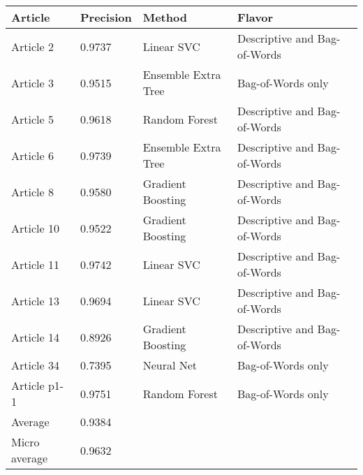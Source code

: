 \begin{tabular}{|l|l|l|l| }
\hline
Article & Precision & Method & Flavor \\ \hline
Article 2 & 0.9737 & Linear SVC & Descriptive and Bag-of-Words\\
Article 3 & 0.9515 & Ensemble Extra Tree & Bag-of-Words only\\
Article 5 & 0.9618 & Random Forest & Descriptive and Bag-of-Words\\
Article 6 & 0.9739 & Ensemble Extra Tree & Descriptive and Bag-of-Words\\
Article 8 & 0.9580 & Gradient Boosting & Descriptive and Bag-of-Words\\
Article 10 & 0.9522 & Gradient Boosting & Descriptive and Bag-of-Words\\
Article 11 & 0.9742 & Linear SVC & Descriptive and Bag-of-Words\\
Article 13 & 0.9694 & Linear SVC & Descriptive and Bag-of-Words\\
Article 14 & 0.8926 & Gradient Boosting & Descriptive and Bag-of-Words\\
Article 34 & 0.7395 & Neural Net & Bag-of-Words only\\
Article p1-1 & 0.9751 & Random Forest & Bag-of-Words only\\
Average & 0.9384 & & \\
Micro average & 0.9632 & & \\
\hline
\end{tabular}